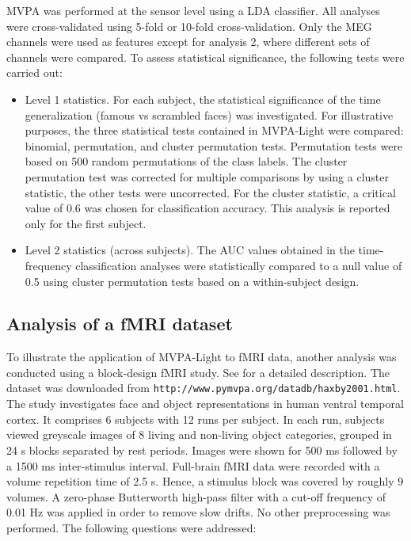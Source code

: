 \documentclass[utf8]{frontiersSCNS} %
\newcommand{\ttt}[1]{\texttt{#1}}
\begin{document}
MVPA was performed at the sensor level using a LDA classifier. All analyses were cross-validated using 5-fold or 10-fold cross-validation. Only the MEG channels were used as features except for analysis 2, where different sets of channels were compared. To assess statistical significance, the following tests were carried out:

\begin{itemize}
    \item Level 1 statistics. For each subject, the statistical significance of the time generalization (famous vs scrambled faces) was investigated. For illustrative purposes, the three statistical tests contained in MVPA-Light were compared: binomial, permutation, and cluster permutation tests. Permutation tests were based on 500 random permutations of the class labels. The cluster permutation test was corrected for multiple comparisons by using a cluster statistic, the other tests were uncorrected. For the cluster statistic, a critical value of 0.6 was chosen for classification accuracy. This analysis is reported only for the first subject.
    \item Level 2 statistics (across subjects). The AUC values obtained in the time-frequency classification analyses were statistically compared to a null value of 0.5 using cluster permutation tests based on a within-subject design.

\end{itemize}

\subsection{Analysis of a fMRI dataset}
To illustrate the application of MVPA-Light to fMRI data, another analysis was conducted using a block-design fMRI study. See \cite{Haxby2001} for a detailed description. The dataset was downloaded from \ttt{http://www.pymvpa.org/datadb/haxby2001.html}. The study investigates face and object representations in human ventral temporal cortex. It comprises 6 subjects with 12 runs per subject. In each run, subjects viewed greyscale images of 8 living and non-living object categories,  grouped in 24 s blocks separated by rest periods. Images were shown for 500 ms followed by a 1500 ms inter-stimulus interval. Full-brain fMRI data were recorded with a volume repetition time of 2.5 s. Hence, a stimulus block was covered by roughly 9 volumes. A zero-phase Butterworth high-pass filter with a cut-off frequency of 0.01 Hz was applied in order to remove slow drifts. No other preprocessing was performed. The following questions were addressed:
\end{document}
